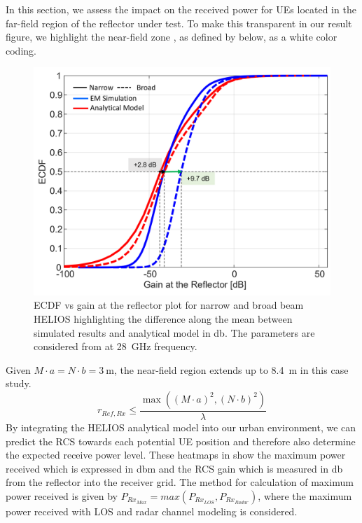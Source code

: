 In this section, we assess the impact on the received power for UEs located in the far-field region of the reflector under test. To make this transparent in our result figure, we highlight the near-field zone \cite{Neubauer1997, hansen1988spherical}, as defined by  below, as a white color coding.
\begin{figure}[H]
	\centering
	\includegraphics[width=0.7\linewidth]{images/Section 4 Images/urbanscenario_analy_sim_ECDF}
	\caption{ECDF vs gain at the reflector plot for narrow and broad beam HELIOS highlighting the difference along the mean between simulated results and analytical model in \si{\decibel}. The parameters are considered from  at \SI{28}{\giga\hertz} frequency. }
	\label{fig:urbanscenario_analy_sim_ECDF}
\end{figure}
Given $M\cdot a=N\cdot b=\SI{3}{\meter}$, the near-field region extends up to \SI{8.4}{\meter} in this case study. 
\begin{equation} \label{Near-field}
	r_{Ref, Rx} \leq \frac{\max \left( \left( M \cdot a \right)^2, \left( N \cdot b \right)^2 \right)}{\lambda}
\end{equation}
By integrating the HELIOS analytical model into our urban environment, we can predict the RCS towards each potential UE position and therefore also determine the expected receive power level. These heatmaps in  show the maximum power received which is expressed in \si{\decibel}m and the RCS gain which is measured in \si{\decibel} from the reflector into the receiver grid. The method for calculation of maximum power received is given by $P_{Rx_{Max}}= max(P_{Rx_{LOS}}, P_{Rx_{Radar}})$, where the maximum power received with LOS and radar channel modeling is considered.

